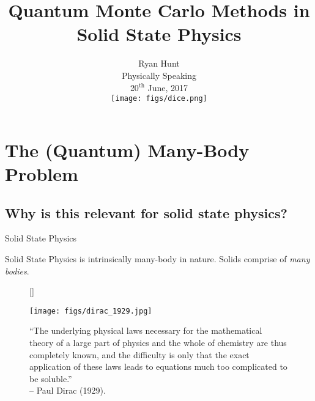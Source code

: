 \documentclass[12pt, pdf, hyperref={draft}, usenames, dvipsnames]{beamer}
\title{Quantum Monte Carlo Methods in \\
       Solid State Physics}
\author{Ryan Hunt \\ Physically Speaking \\ 20$^{\text{th}}$ June, 2017 \\
\vspace*{0.5cm}\texttt{[image: figs/dice.png]}}
\date{}
\begin{document}
\begin{frame}[plain]
  \titlepage\end{frame}




\section{The (Quantum) Many-Body Problem}
\subsection{Why is this relevant for solid state physics?}

\begin{frame}{Solid State Physics}

Solid State Physics is intrinsically many-body in nature. Solids
comprise of {\itshape\/many bodies}.

\begin{figure}[H]
  [\FBwidth]
  {\caption*{``The underlying physical laws necessary for the
  mathematical theory of a large part of physics and the whole of chemistry are
  thus completely known, and the difficulty is only that the exact application
  of these laws leads to equations much too complicated to be
  soluble.'' \\ \hfill -- Paul Dirac (1929).}\label{fig:dirac}}
  {\texttt{[image: figs/dirac\_1929.jpg]}}
\end{figure}
\end{frame}
\end{document}
